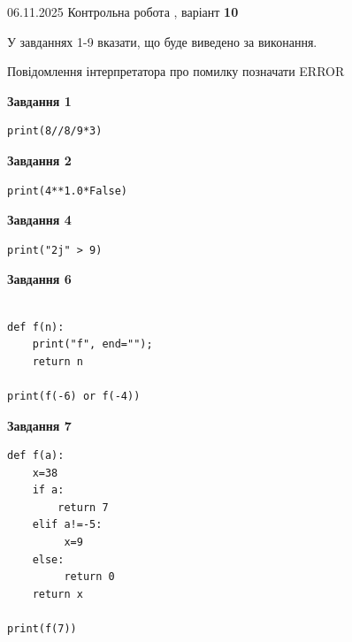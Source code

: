 \documentclass[12pt, ukrainian]{article}
\begin{document}
{\Large{06.11.2025 Контрольна робота , варіант  \No \textbf { 10 }\par}}
{
\begin {large}
У завданнях 1-9 вказати, що буде виведено за виконання.

Повідомлення інтерпретатора про помилку позначати ERROR

\begin{minipage}[t]{7.5cm}

\begin{center}
\textbf{Завдання 1}
\end{center}

\begin{verbatim}
print(8//8/9*3)
\end{verbatim}



\begin{center}
\textbf{Завдання 2}
\end{center}

\begin{verbatim}
print(4**1.0*False)
\end{verbatim}



\begin{center}
\textbf{Завдання 4}
\end{center}

\begin{verbatim}
print("2j" > 9)
\end{verbatim}



\begin{center}
\textbf{Завдання 6}
\end{center}

\begin{verbatim}

def f(n):
    print("f", end="");
    return n

print(f(-6) or f(-4))
\end{verbatim}



\begin{center}
\textbf{Завдання 7}
\end{center}

\begin{verbatim}
def f(a):
    x=38
    if a: 
        return 7
    elif a!=-5:
         x=9
    else:
         return 0
    return x

print(f(7))
\end{verbatim}


\end{minipage}
\end{large}}
\end{document}
